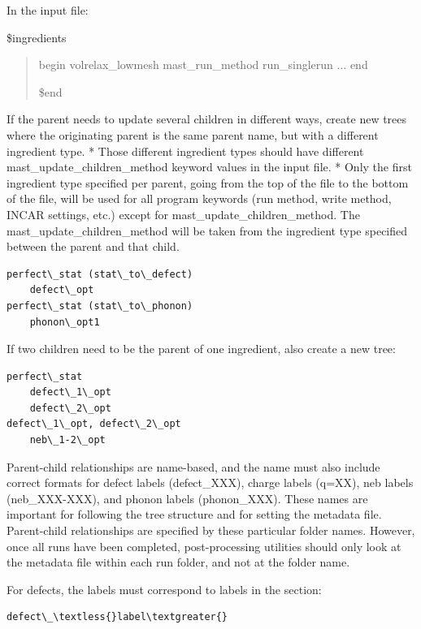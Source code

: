 \documentclass[letterpaper,10pt,english]{sphinxmanual}
\begin{document}
In the input file:

\$ingredients
\begin{quote}

begin volrelax\_lowmesh
mast\_run\_method run\_singlerun
...
end

\$end
\end{quote}

If the parent needs to update several children in different ways, create new trees where the originating parent is the same parent name, but with a different ingredient type.
*  Those different ingredient types should have different mast\_update\_children\_method keyword values in the input file.
*  Only the first ingredient type specified per parent, going from the top of the file to the bottom of the file, will be used for all program keywords (run method, write method, INCAR settings, etc.) except for mast\_update\_children\_method. The mast\_update\_children\_method will be taken from the ingredient type specified between the parent and that child.

\begin{Verbatim}[commandchars=\\\{\}]
perfect\_stat (stat\_to\_defect)
    defect\_opt
perfect\_stat (stat\_to\_phonon)
    phonon\_opt1
\end{Verbatim}

If two children need to be the parent of one ingredient, also create a new tree:

\begin{Verbatim}[commandchars=\\\{\}]
perfect\_stat
    defect\_1\_opt
    defect\_2\_opt
defect\_1\_opt, defect\_2\_opt
    neb\_1-2\_opt
\end{Verbatim}

Parent-child relationships are name-based, and the name must also include correct formats for defect labels (defect\_XXX), charge labels (q=XX), neb labels (neb\_XXX-XXX), and phonon labels (phonon\_XXX). These names are important for following the tree structure and for setting the metadata file. Parent-child relationships are specified by these particular folder names. However, once all runs have been completed, post-processing utilities should only look at the metadata file within each run folder, and not at the folder name.

For defects, the labels must correspond to labels in the  section:

\begin{Verbatim}[commandchars=\\\{\}]
defect\_\textless{}label\textgreater{}
\end{Verbatim}
\end{document}

